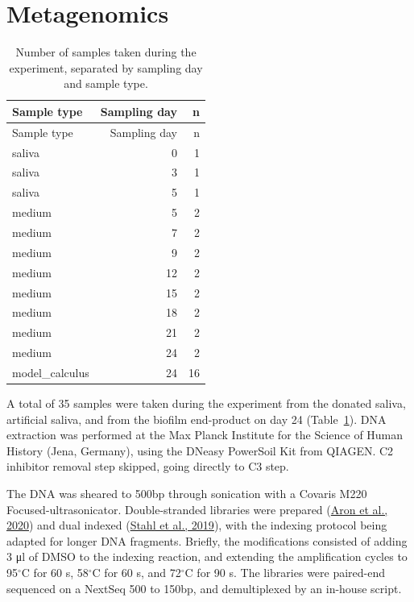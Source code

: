 \documentclass[
  letterpaper,
]{book}
\begin{document}
\hypertarget{metagenomics}{%
\section{Metagenomics}\label{metagenomics}}

\hypertarget{tbl-dna-samples}{}
\begin{longtable}[]{@{}lrr@{}}
\caption{\label{tbl-dna-samples}Number of samples taken during the
experiment, separated by sampling day and sample type.}\tabularnewline
\toprule\noalign{}
Sample type & Sampling day & n \\
\midrule\noalign{}
\endfirsthead
\toprule\noalign{}
Sample type & Sampling day & n \\
\midrule\noalign{}
\endhead
\bottomrule\noalign{}
\endlastfoot
saliva & 0 & 1 \\
saliva & 3 & 1 \\
saliva & 5 & 1 \\
medium & 5 & 2 \\
medium & 7 & 2 \\
medium & 9 & 2 \\
medium & 12 & 2 \\
medium & 15 & 2 \\
medium & 18 & 2 \\
medium & 21 & 2 \\
medium & 24 & 2 \\
model\_calculus & 24 & 16 \\
\end{longtable}

A total of 35 samples were taken during the experiment from the donated
saliva, artificial saliva, and from the biofilm end-product on day 24
(Table~\ref{tbl-dna-samples}). DNA extraction was performed at the Max
Planck Institute for the Science of Human History (Jena, Germany), using
the DNeasy PowerSoil Kit from QIAGEN. C2 inhibitor removal step skipped,
going directly to C3 step.

The DNA was sheared to 500bp through sonication with a Covaris M220
Focused-ultrasonicator. Double-stranded libraries were prepared
(\protect\hyperlink{ref-aronHalfUDG2020}{Aron et al., 2020}) and dual
indexed (\protect\hyperlink{ref-stahlDoublestrandedIndexing2019}{Stahl
et al., 2019}), with the indexing protocol being adapted for longer DNA
fragments. Briefly, the modifications consisted of adding 3 μl of DMSO
to the indexing reaction, and extending the amplification cycles to
95\(^{\circ}\)C for 60 s, 58\(^{\circ}\)C for 60 s, and 72\(^{\circ}\)C
for 90 s. The libraries were paired-end sequenced on a NextSeq 500 to
150bp, and demultiplexed by an in-house script.
\end{document}
